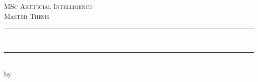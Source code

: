 
\newcommand{\red}[1]{{\color{red}{#1}}}




\begin{titlepage}

\newcommand{\HRule}{\rule{\linewidth}{0.5mm}} %
\center %
 

\textsc{\Large MSc Artificial Intelligence}\\[0.2cm]
\textsc{\Large Master Thesis}\\[0.5cm] 


\HRule \\[0.4cm]
{ \huge \bfseries \red{
    Type-driven Programming-by-Example \\
}}%
\HRule \\[0.5cm]
 

by\\[0.2cm]
\textsc{\Large \red{Kiara Grouwstra}}\\[0.2cm]
\red{6195180}\\[1cm]



\end{titlepage}
